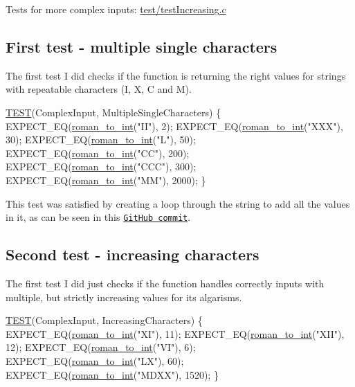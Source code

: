 Tests for more complex inputs\+: \hyperlink{test_increasing_8c}{test/test\+Increasing.\+c}

\subsection*{First test -\/ multiple single characters }

The first test I did checks if the function is returning the right values for strings with repeatable characters (I, X, C and M).


\begin{DoxyCodeInclude}
\hyperlink{test_simple_8c_aff9fa977573ddab7597e233f1775d7c5}{TEST}(ComplexInput, MultipleSingleCharacters) \{
    EXPECT\_EQ(\hyperlink{roman_8c_a5d15ad3ed29e4dc0fed9b718523c48c8}{roman\_to\_int}(\textcolor{stringliteral}{"II"}), 2);
    EXPECT\_EQ(\hyperlink{roman_8c_a5d15ad3ed29e4dc0fed9b718523c48c8}{roman\_to\_int}(\textcolor{stringliteral}{"XXX"}), 30);
    EXPECT\_EQ(\hyperlink{roman_8c_a5d15ad3ed29e4dc0fed9b718523c48c8}{roman\_to\_int}(\textcolor{stringliteral}{"L"}), 50);
    EXPECT\_EQ(\hyperlink{roman_8c_a5d15ad3ed29e4dc0fed9b718523c48c8}{roman\_to\_int}(\textcolor{stringliteral}{"CC"}), 200);
    EXPECT\_EQ(\hyperlink{roman_8c_a5d15ad3ed29e4dc0fed9b718523c48c8}{roman\_to\_int}(\textcolor{stringliteral}{"CCC"}), 300);
    EXPECT\_EQ(\hyperlink{roman_8c_a5d15ad3ed29e4dc0fed9b718523c48c8}{roman\_to\_int}(\textcolor{stringliteral}{"MM"}), 2000);
\}
\end{DoxyCodeInclude}
 This test was satisfied by creating a loop through the string to add all the values in it, as can be seen in this \href{https://github.com/diogenes1oliveira/libroman/commit/637a23468d94b2257037522e7fdd3f34160322ab#diff-3d6fc1bf772186c45fcd2c22d7ecd7b4}{\tt Git\+Hub commit}.

\subsection*{Second test -\/ increasing characters }

The first test I did just checks if the function handles correctly inputs with multiple, but strictly increasing values for its algarisms.


\begin{DoxyCodeInclude}
\hyperlink{test_simple_8c_aff9fa977573ddab7597e233f1775d7c5}{TEST}(ComplexInput, IncreasingCharacters) \{
    EXPECT\_EQ(\hyperlink{roman_8c_a5d15ad3ed29e4dc0fed9b718523c48c8}{roman\_to\_int}(\textcolor{stringliteral}{"XI"}), 11);
    EXPECT\_EQ(\hyperlink{roman_8c_a5d15ad3ed29e4dc0fed9b718523c48c8}{roman\_to\_int}(\textcolor{stringliteral}{"XII"}), 12);
    EXPECT\_EQ(\hyperlink{roman_8c_a5d15ad3ed29e4dc0fed9b718523c48c8}{roman\_to\_int}(\textcolor{stringliteral}{"VI"}), 6);
    EXPECT\_EQ(\hyperlink{roman_8c_a5d15ad3ed29e4dc0fed9b718523c48c8}{roman\_to\_int}(\textcolor{stringliteral}{"LX"}), 60);
    EXPECT\_EQ(\hyperlink{roman_8c_a5d15ad3ed29e4dc0fed9b718523c48c8}{roman\_to\_int}(\textcolor{stringliteral}{"MDXX"}), 1520);
\}
\end{DoxyCodeInclude}
